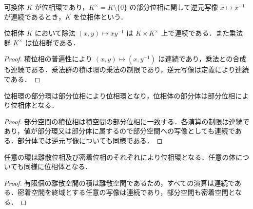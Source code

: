\begin{defn}[位相体]
可換体 $K$ が位相環であり，$K^\times=K\setminus\{0\}$ の部分位相に関して逆元写像 $x\mapsto x^{-1}$ が連続であるとき，$K$ を位相体という．
\end{defn}
\begin{prop}[除法の連続性]
位相体 $K$ において除法 $(x,y)\mapsto xy^{-1}$ は $K\times K^\times$ 上で連続である．また乗法群 $K^\times$ は位相群である．
\end{prop}
\begin{proof}
積位相の普遍性により $(x,y)\mapsto(x,y^{-1})$ は連続であり，乗法との合成も連続である．乗法群の積は環の乗法の制限であり，逆元写像は定義により連続である．
\end{proof}
\begin{prop}[部分環と部分体]
位相環の部分環は部分位相により位相環となり，位相体の部分体は部分位相により位相体となる．
\end{prop}
\begin{proof}
部分空間の積位相は積空間の部分位相に一致する．各演算の制限は連続であり，値が部分環又は部分体に属するので部分空間への写像としても連続である．部分体では逆元写像についても同様である．
\end{proof}
\begin{prop}[離散位相と密着位相]
任意の環は離散位相及び密着位相のそれぞれにより位相環となる．任意の体についても同様に位相体となる．
\end{prop}
\begin{proof}
有限個の離散空間の積は離散空間であるため，すべての演算は連続である．密着空間を終域とする任意の写像は連続であり，部分空間も密着空間となる．
\end{proof}
